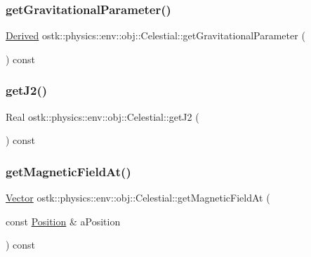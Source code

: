 \subsubsection{\texorpdfstring{get\+Gravitational\+Parameter()}{getGravitationalParameter()}}
{\footnotesize\ttfamily \hyperlink{classostk_1_1physics_1_1units_1_1_derived}{Derived} ostk\+::physics\+::env\+::obj\+::\+Celestial\+::get\+Gravitational\+Parameter (\begin{DoxyParamCaption}{ }\end{DoxyParamCaption}) const}

\mbox{\label{classostk_1_1physics_1_1env_1_1obj_1_1_celestial_ac7b892c6433c93f227d53f59285aac1d}} 
\subsubsection{\texorpdfstring{get\+J2()}{getJ2()}}
{\footnotesize\ttfamily Real ostk\+::physics\+::env\+::obj\+::\+Celestial\+::get\+J2 (\begin{DoxyParamCaption}{ }\end{DoxyParamCaption}) const}

\mbox{\label{classostk_1_1physics_1_1env_1_1obj_1_1_celestial_ae2cd7ac1cb6a896390394b77cffa0297}} 
\subsubsection{\texorpdfstring{get\+Magnetic\+Field\+At()}{getMagneticFieldAt()}}
{\footnotesize\ttfamily \hyperlink{classostk_1_1physics_1_1data_1_1_vector}{Vector} ostk\+::physics\+::env\+::obj\+::\+Celestial\+::get\+Magnetic\+Field\+At (\begin{DoxyParamCaption}\item[{const \hyperlink{classostk_1_1physics_1_1coord_1_1_position}{Position} \&}]{a\+Position }\end{DoxyParamCaption}) const}

